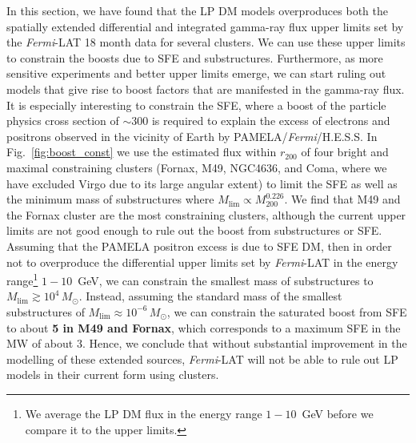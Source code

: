 \documentclass[10pt,aps,pra,reprint,amsmath,amsfonts,amssymb,showpacs,nofootinbib,floatfix]{revtex4-1}
\def\C#1{{\bf #1}}
\newcommand{\Fermi}{{\em Fermi}\xspace}
\newcommand{\rmn}{\mathrm}
\newcommand{\msun}{M_\odot}
\newcommand{\rvir}{r_{200}}
\newcommand{\mvir}{M_{200}}
\begin{document}
In this section, we have found that the LP DM models overproduces both
the spatially extended differential and integrated gamma-ray flux
upper limits set by the \Fermi-LAT 18 month data for several
clusters. We can use these upper limits to constrain the boosts due to
SFE and substructures. Furthermore, as more sensitive experiments and
better upper limits emerge, we can start ruling out models that give
rise to boost factors that are manifested in the gamma-ray flux. It is
especially interesting to constrain the SFE, where a boost of the
particle physics cross section of $\sim$300 is required to explain the
excess of electrons and positrons observed in the vicinity of Earth by
PAMELA/\Fermi/H.E.S.S. In Fig.~\ref{fig:boost_const} we use the
estimated flux within $\rvir$ of four bright and maximal constraining
clusters (Fornax, M49, NGC4636, and Coma, where we have excluded Virgo
due to its large angular extent) to limit the SFE as well as the
minimum mass of substructures where
$M_\rmn{lim}\propto\mvir^{0.226}$. We find that M49 and the Fornax
cluster are the most constraining clusters, although the current upper
limits are not good enough to rule out the boost from substructures or
SFE. Assuming that the PAMELA positron excess is due to SFE DM, then
in order not to overproduce the differential upper limits set by
\Fermi-LAT in the energy range\footnote{We average the LP DM flux in
  the energy range $1-10$~GeV before we compare it to the upper
  limits.}  $1-10$~GeV, we can constrain the smallest mass of
substructures to $M_\rmn{lim}\gtrsim 10^4\,\msun$. Instead, assuming
the standard mass of the smallest substructures of $M_\rmn{lim}\approx
10^{-6}\,\msun$, we can constrain the saturated boost from SFE to
about \C{5 in M49 and Fornax}, which corresponds to a maximum SFE in the
MW of about 3. Hence, we conclude that without substantial improvement
in the modelling of these extended sources, \Fermi-LAT will not be
able to rule out LP models in their current form using clusters.
\end{document}
